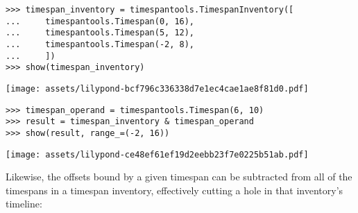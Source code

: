 \begin{comment}
<abjad>
timespan_inventory = timespantools.TimespanInventory([
    timespantools.Timespan(0, 16),
    timespantools.Timespan(5, 12),
    timespantools.Timespan(-2, 8),
    ])
show(timespan_inventory)
timespan_operand = timespantools.Timespan(6, 10)
result = timespan_inventory & timespan_operand
show(result, range_=(-2, 16))
</abjad>
\end{comment}

\begin{abjadbookoutput}
\begin{singlespacing}
\vspace{-0.5\baselineskip}
\begin{lstlisting}
>>> timespan_inventory = timespantools.TimespanInventory([
...     timespantools.Timespan(0, 16),
...     timespantools.Timespan(5, 12),
...     timespantools.Timespan(-2, 8),
...     ])
>>> show(timespan_inventory)
\end{lstlisting}
\noindent\texttt{[image: assets/lilypond-bcf796c336338d7e1ec4cae1ae8f81d0.pdf]}
\begin{lstlisting}
>>> timespan_operand = timespantools.Timespan(6, 10)
>>> result = timespan_inventory & timespan_operand
>>> show(result, range_=(-2, 16))
\end{lstlisting}
\noindent\texttt{[image: assets/lilypond-ce48ef61ef19d2eebb23f7e0225b51ab.pdf]}
\end{singlespacing}
\end{abjadbookoutput}

\noindent Likewise, the offsets bound by a given timespan can be subtracted
from all of the timespans in a timespan inventory, effectively cutting a hole
in that inventory's timeline:

\begin{comment}
<abjad>
timespan_inventory = timespantools.TimespanInventory([
    timespantools.Timespan(0, 16),
    timespantools.Timespan(5, 12),
    timespantools.Timespan(-2, 8),
    ])
show(timespan_inventory)
timespan_operand = timespantools.Timespan(6, 10)
result = timespan_inventory - timespan_operand
show(result)
</abjad>
\end{comment}

